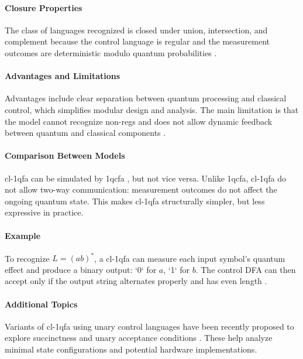 \paragraph{Closure Properties}  
The class of languages recognized is closed under union, intersection, and complement because the control language is regular and the measurement outcomes are deterministic modulo quantum probabilities \cite{li2015hybrid}.

\paragraph{Advantages and Limitations}  
Advantages include clear separation between quantum processing and classical control, which simplifies modular design and analysis. The main limitation is that the model cannot recognize non-\glspl{reg} and does not allow dynamic feedback between quantum and classical components \cite{li2015hybrid}.

\paragraph{Comparison Between Models}  
\gls{cl-1qfa} can be simulated by \gls{1qcfa} \cite{li2015hybrid}, but not vice versa. Unlike \gls{1qcfa}, \gls{cl-1qfa} do not allow two-way communication: measurement outcomes do not affect the ongoing quantum state. This makes \gls{cl-1qfa} structurally simpler, but less expressive in practice.

\paragraph{Example}  
To recognize $L = (ab)^*$, a \gls{cl-1qfa} can measure each input symbol's quantum effect and produce a binary output: `0` for $a$, `1` for $b$. The control DFA can then accept only if the output string alternates properly and has even length \cite{mereghetti2006quantum}.

\paragraph{Additional Topics}  
Variants of \gls{cl-1qfa} using unary control languages have been recently proposed to explore succinctness and unary acceptance conditions \cite{mereghetti2024unary}. These help analyze minimal state configurations and potential hardware implementations.


\subsubsection{}

